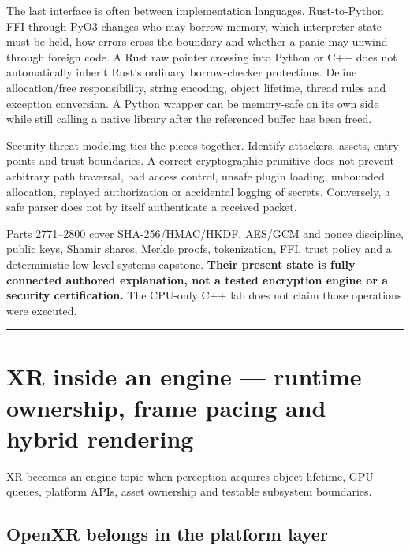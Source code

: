 The last interface is often between implementation languages. Rust-to-Python FFI through PyO3 changes who may borrow memory, which interpreter state must be held, how errors cross the boundary and whether a panic may unwind through foreign code. A Rust raw pointer crossing into Python or C++ does not automatically inherit Rust's ordinary borrow-checker protections. Define allocation/free responsibility, string encoding, object lifetime, thread rules and exception conversion. A Python wrapper can be memory-safe on its own side while still calling a native library after the referenced buffer has been freed.

Security threat modeling ties the pieces together. Identify attackers, assets, entry points and trust boundaries. A correct cryptographic primitive does not prevent arbitrary path traversal, bad access control, unsafe plugin loading, unbounded allocation, replayed authorization or accidental logging of secrets. Conversely, a safe parser does not by itself authenticate a received packet.

Parts 2771--2800 cover SHA-256/HMAC/HKDF, AES/GCM and nonce discipline, public keys, Shamir shares, Merkle proofs, tokenization, FFI, trust policy and a deterministic low-level-systems capstone. \textbf{Their present state is fully connected authored explanation, not a tested encryption engine or a security certification.} The CPU-only C++ lab does not claim those operations were executed.

\begin{center}\rule{0.5\linewidth}{0.5pt}\end{center}

\section{XR inside an engine --- runtime ownership, frame pacing and hybrid rendering}\label{06-engine-ii-ch042-xr-inside-an-engine-runtime-ownership-frame-pacing-and-hybrid-rendering}

\hypertarget{06-engine-ii-ch042-xr-inside-an-engine-runtime-ownership-frame-pacing-and-hybrid-rendering}{}

XR becomes an engine topic when perception acquires object lifetime, GPU queues, platform APIs, asset ownership and testable subsystem boundaries.

\subsection{OpenXR belongs in the platform layer}\label{06-engine-ii-ch042-openxr-belongs-in-the-platform-layer}

